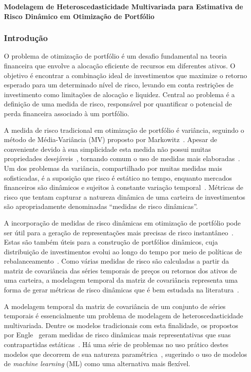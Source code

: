 \documentclass[a4paper, 12pt]{article}
\begin{document}
\textbf{Modelagem de Heteroscedasticidade Multivariada para Estimativa de Risco
Dinâmico em Otimização de Portfólio}
\subsubsection*{Introdução}
\begin{spacing}{.9}
O problema de otimização de portfólio é um desafio fundamental na teoria
financeira que envolve a alocação eficiente de recursos em diferentes ativos. O
objetivo é encontrar a combinação ideal de investimentos que maximize o retorno
esperado para um determinado nível de risco, levando em conta restrições de
investimento como limitações de alocação e liquidez. Central ao problema é a
definição de uma medida de risco, responsável por quantificar o potencial de
perda financeira associado à um portfólio.%

A medida de risco tradicional em otimização de portfólio é variância, seguindo
o método de Média-Variância (MV) proposto por Markowitz~\cite{markowitz}.
Apesar de conveniente devido à sua simplicidade esta medida não possui muitas
propriedades desejáveis~\cite{rachev}, tornando comum o uso de medidas mais
elaboradas~\cite{gambrah2014risk}. Um dos problemas da variância, compartilhado
por muitas medidas mais sofisticadas, é a
suposição que risco é estático no tempo, enquanto mercados financeiros são
dinâmicos e sujeitos à constante variação temporal~\cite{procacci}. Métricas de
risco que tentam capturar a natureza dinâmica de uma carteira de investimentos
são apropriadamente denominadas ``medidas de risco dinâmicas''.

A incorporação de medidas de risco dinâmicas em otimização de portfólio pode
ser útil para a geração de representações mais precisas de risco
instantâneo~\cite{chan1999portfolio}. Estas são também úteis para a
construção de portfólios dinâmicos, cuja distribuição de investimentos
evolui ao longo do tempo por meio de políticas de
rebalanceamento~\cite{metin, holten}. Como várias medidas de risco são
calculadas a partir da matriz de covariância das séries temporais de preços
ou retornos dos ativos de uma carteira, a modelagem temporal da matriz de
covariância representa uma forma de gerar métricas de risco dinâmicas que é bem
estudada na literatura~\cite{chan1999portfolio}.

A modelagem temporal da matriz de covariância de um conjunto de séries
temporais é essencialmente um problema de modelagem de heteroscedasticidade
multivariada. Dentre os modelos tradicionais com esta finalidade, os propostos
por Engle~\cite{bauwens} geram medidas de risco dinâmicas mais representativas
que suas contrapartidas estáticas~\cite{metin, holten, weirum}. Há uma série de
problemas no uso prático destes modelos que decorrem de sua natureza
paramétrica~\cite{morettin}, sugerindo o uso de modelos de \emph{machine
learning} (ML) como uma alternativa mais flexível.


\end{spacing}
\end{document}
